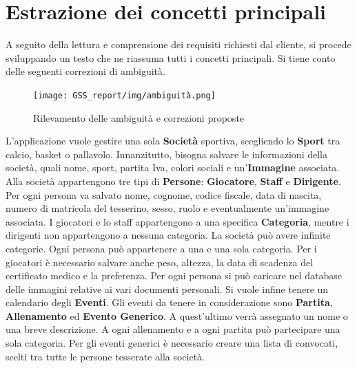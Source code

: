\documentclass[a4paper,12pt]{report}
\begin{document}
\section{Estrazione dei concetti principali}
A seguito della lettura e comprensione dei requisiti richiesti dal cliente, si procede sviluppando un testo che ne riassuma tutti i concetti principali. 
Si tiene conto delle seguenti correzioni di ambiguità.

\begin{figure}[htp]
    \centering
    \texttt{[image: GSS\_report/img/ambiguità.png]}
    \caption{Rilevamento delle ambiguità e correzioni proposte}
    \label{fig:umlAnalisys}
\end{figure}

L'applicazione vuole gestire una sola \textbf{Società} sportiva, scegliendo lo \textbf{Sport} tra calcio, basket o pallavolo. \newline
Innanzitutto, bisogna salvare le informazioni della società, quali nome, sport, partita Iva, colori sociali e un'\textbf{Immagine} associata. \newline
Alla società appartengono tre tipi di \textbf{Persone}: \textbf{Giocatore}, \textbf{Staff} e \textbf{Dirigente}. Per ogni persona va salvato nome, cognome, codice fiscale, data di nascita, numero di matricola del tesserino, sesso, ruolo e eventualmente un'immagine associata. \newline
I giocatori e lo staff appartengono a una specifica \textbf{Categoria}, mentre i dirigenti non appartengono a nessuna categoria. La società può avere infinite categorie.
Ogni persona può appartenere a una e una sola categoria. \newline
Per i giocatori è necessario salvare anche peso, altezza, la data di scadenza del certificato medico e la preferenza. \newline
Per ogni persona si può caricare nel database delle immagini relative ai vari documenti personali.
\newline
Si vuole infine tenere un calendario degli \textbf{Eventi}. Gli eventi da tenere in considerazione sono \textbf{Partita}, \textbf{Allenamento} ed \textbf{Evento Generico}. A quest'ultimo verrà assegnato un nome o una breve descrizione. \newline
A ogni allenamento e a ogni partita può partecipare una sola categoria. Per gli eventi generici è necessario creare una lista di convocati, scelti tra tutte le persone tesserate alla società.
\end{document}
